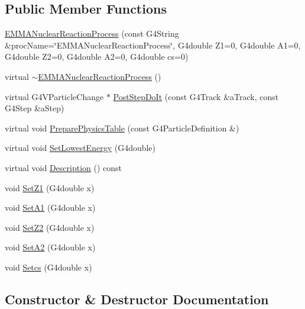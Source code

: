 \subsection*{Public Member Functions}
\begin{DoxyCompactItemize}
\item 
\hyperlink{classEMMANuclearReactionProcess_ad80bfc6b5331a43bb8e635ea1f93e0a7}{E\+M\+M\+A\+Nuclear\+Reaction\+Process} (const G4\+String \&proc\+Name=\char`\"{}E\+M\+M\+A\+Nuclear\+Reaction\+Process\char`\"{}, G4double Z1=0, G4double A1=0, G4double Z2=0, G4double A2=0, G4double cs=0)
\item 
virtual \hyperlink{classEMMANuclearReactionProcess_a527a122911c5fd91db8469ddd35e18b8}{$\sim$\+E\+M\+M\+A\+Nuclear\+Reaction\+Process} ()
\item 
virtual G4\+V\+Particle\+Change $\ast$ \hyperlink{classEMMANuclearReactionProcess_ae0f5c5da5e7b5de92ae0ef4ce0cc184f}{Post\+Step\+Do\+It} (const G4\+Track \&a\+Track, const G4\+Step \&a\+Step)
\item 
virtual void \hyperlink{classEMMANuclearReactionProcess_a23802b4c0b8ee37634133f55cbdd050d}{Prepare\+Physics\+Table} (const G4\+Particle\+Definition \&)
\item 
virtual void \hyperlink{classEMMANuclearReactionProcess_a5c58ee84e79b3a88abd95a1b69ec4adf}{Set\+Lowest\+Energy} (G4double)
\item 
virtual void \hyperlink{classEMMANuclearReactionProcess_a6331442f66f044b7309c567de2a2e652}{Description} () const 
\item 
void \hyperlink{classEMMANuclearReactionProcess_ab983a478e9cda304277033b3d7a22995}{Set\+Z1} (G4double x)
\item 
void \hyperlink{classEMMANuclearReactionProcess_ac18e9c45796a362619f28f518e0d5016}{Set\+A1} (G4double x)
\item 
void \hyperlink{classEMMANuclearReactionProcess_a27bc9f76a9b360a720bb6f50c7fde0b8}{Set\+Z2} (G4double x)
\item 
void \hyperlink{classEMMANuclearReactionProcess_ab63302297eb8193ac523c0651ccd1344}{Set\+A2} (G4double x)
\item 
void \hyperlink{classEMMANuclearReactionProcess_aef727862352458b11abd2b0c4a5f33cb}{Setcs} (G4double x)
\end{DoxyCompactItemize}


\subsection{Constructor \& Destructor Documentation}
